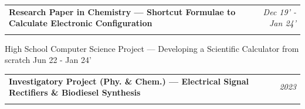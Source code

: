 \documentclass[a4paper,11pt]{article}
\makeatletter
\newcommand{\resumeProject}[4]{
\vspace{0.10mm}\item
    \begin{tabular*}{0.98\textwidth}[t]{l@{\extracolsep{\fill}}r}
        \textbf{#1} & \textit{\footnotesize{#3}} \\ [-1.3mm]
        \footnotesize{\textit{#2}} & \footnotesize{#4}
    \end{tabular*}
    \vspace{-3.6 mm}
}
\newcommand{\resumeItemListStart}{\begin{justify}\begin{itemize}[leftmargin=3ex, rightmargin=2ex, noitemsep,labelsep=1.2mm,itemsep=0mm]\small}
\newcommand{\resumeSubHeadingListEnd}{\end{itemize}\vspace{2mm}}
\newcommand{\resumeItemListEnd}{\end{itemize}\end{justify}\vspace{-2mm}}
\makeatother
\begin{document}
      

    \resumeProject
      { Research Paper in Chemistry — \textnormal{\small Shortcut Formulae to Calculate Electronic Configuration}} %
      {\vspace{-4mm}}
      {Dec 19’ - Jan 24’} %

    \resumeProject
      { High School Computer Science Project — \textnormal{\small Developing a Scientific Calculator from scratch}} %
      {\vspace{-4mm}}
      {Jun 22 - Jan 24’} %



    \resumeProject
      { Investigatory Project (Phy. \& Chem.) — \textnormal{\small Electrical Signal Rectifiers \& Biodiesel Synthesis}} %
      {\vspace{-4mm}}
      {2023} %




  \resumeSubHeadingListEnd
\vspace{-5.5 mm}



\end{document}
